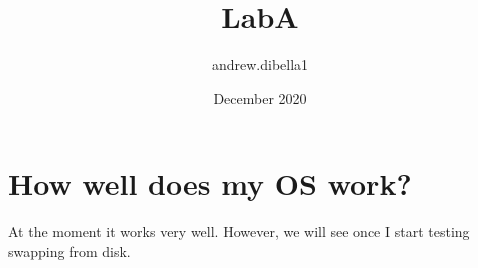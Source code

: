 \documentclass{article}
\title{LabA}
\author{andrew.dibella1 }
\date{December 2020}
\begin{document}
\maketitle

\section{How well does my OS work?}
At the moment it works very well. However, we will see once I start testing swapping from disk.
\end{document}
